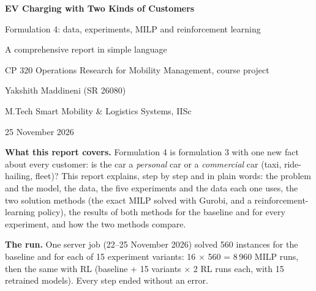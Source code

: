 \documentclass[11pt,a4paper]{article}
\renewcommand{\_}{\origunderscore\allowbreak}
\begin{document}
\begin{titlepage}
\centering
\vspace*{2cm}
{\LARGE\bfseries\color{headblue} EV Charging with Two Kinds of Customers\par}
\vspace{6pt}
{\Large Formulation 4: data, experiments, MILP and reinforcement learning\par}
\vspace{4pt}
{\large A comprehensive report in simple language\par}
\vspace{16pt}
{\large CP 320 Operations Research for Mobility Management, course project\par}
\vspace{24pt}
{\large Yakshith Maddineni (SR 26080)\par}
{\normalsize M.Tech Smart Mobility \& Logistics Systems, IISc\par}
\vspace{6pt}
{\normalsize 25 November 2026\par}
\vfill
\begin{keybox}
\textbf{What this report covers.} Formulation 4 is formulation 3 with one new fact about every customer: is the car a \emph{personal} car or a \emph{commercial} car (taxi, ride-hailing, fleet)? This report explains, step by step and in plain words: the problem and the model, the data, the five experiments and the data each one uses, the two solution methods (the exact MILP solved with Gurobi, and a reinforcement-learning policy), the results of both methods for the baseline and for every experiment, and how the two methods compare.

\textbf{The run.} One server job (22--25 November 2026) solved 560 instances for the baseline and for each of 15 experiment variants: 16 $\times$ 560 = 8\,960 MILP runs, then the same with RL (baseline + 15 variants $\times$ 2 RL runs each, with 15 retrained models). Every step ended without an error.
\end{keybox}
\end{titlepage}
\end{document}
